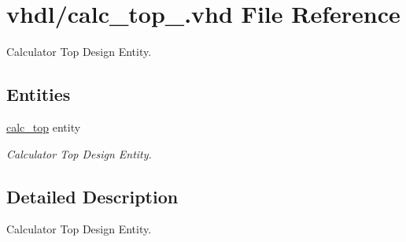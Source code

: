 \hypertarget{calc__top___8vhd}{}\section{vhdl/calc\+\_\+top\+\_\+.vhd File Reference}
\label{calc__top___8vhd}


Calculator Top Design Entity.  


\subsection*{Entities}
\begin{DoxyCompactItemize}
\item 
\hyperlink{classcalc__top}{calc\+\_\+top} entity
\begin{DoxyCompactList}\small\item\em Calculator Top Design Entity. \end{DoxyCompactList}\end{DoxyCompactItemize}


\subsection{Detailed Description}
Calculator Top Design Entity. 

